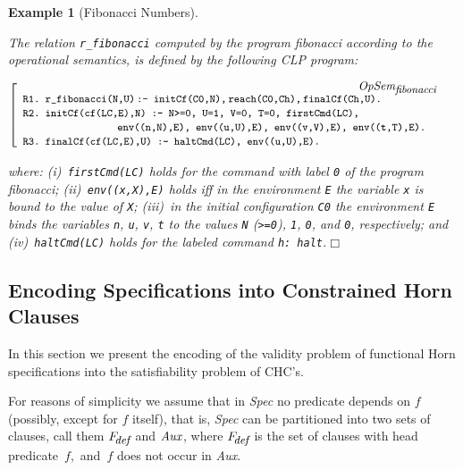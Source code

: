 \documentclass[english]{tlp}
\newtheorem{example}{Example}       \newtheorem{definition}{Definition}
\newcommand{\eop}{\hfill$\Box$}
\begin{document}
\begin{example}[Fibonacci Numbers]
\begin{rm}
The relation {\tt r\_fibonacci} computed by the program \textit{fibonacci} 
according to the operational semantics,
is defined by the following CLP program:


\noindent
${\scriptstyle{\left[
\begin{array}{lll}
 & & \hspace*{-27mm}\raisebox{1mm}{$\textit{OpSem}_{\textit{\small fibonacci}}$}\\[-1.5mm]
{\small\texttt{R1.~r\_fibonacci(N,U)\,:- initCf(C0,N),\,reach(C0,Ch),\,finalCf(Ch,U).}}& & \\
{\small\texttt{R2.~initCf(cf(LC,E),N) :- N>=0, U=1, V=0, T=0, firstCmd(LC),}}& & \\
\hspace{28mm}{\small\texttt{env((n,N),E), env((u,U),E), env((v,V),E), env((t,T),E).}}& & \\
{\small\texttt{R3.~finalCf(cf(LC,E),U) :- haltCmd(LC), env((u,U),E).}}\\
\end{array}
\right.
}}$

\smallskip
\noindent
where: (i)~{\tt firstCmd(LC)} holds for the command
with label {\tt 0} of the  program \textit{fibo\-nacci};
(ii)~{\tt env((x,X),E)}  holds iff in the environment {\tt E} the variable 
{\tt x} is bound to the value of {\tt X};
(iii)~in the initial configuration {\tt C0} the environment {\tt E}
binds the variables {\tt n}, {\tt u}, {\tt v}, {\tt t} 
to the values
{\tt N} ({\tt >=0}), {\tt 1}, {\tt 0}, and {\tt 0}, respectively; and
(iv)~{\tt haltCmd(LC)} holds for the labeled command {\tt h:\,halt}.\eop
\end{rm}
\end{example}


\subsection{Encoding Specifications into Constrained Horn Clauses}
\label{subsec:PC}

In this section we present the encoding of the 
validity problem of functional Horn specifications into the satisfiability 
problem of CHC's.
 
For reasons of simplicity we assume that in \textit{Spec} 
no predicate depends on $f$ (possibly, except for $f$ itself),
that is,  \textit{Spec} can be partitioned into two sets of clauses,
call them $F_{\!\textit{\small def}}$
and $\textit{Aux\/}$, where $F_{\!\textit{\small def}}$
is the set of clauses with head predicate~$f\!,$ and~$f$ does not occur in \textit{Aux}. 
\end{document}
